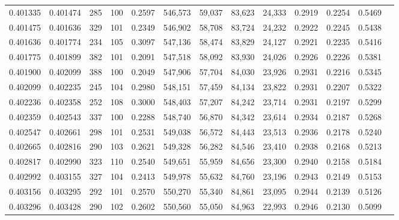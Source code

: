 \begin{tabular}{rrrrrrrrrrrrr}
0.401335 & 0.401474 &   285 & 100 &                                     0.2597 & 546,573 &  59,037 &  83,623 &  24,333 & 0.2919 & 0.2254 & 0.5469 \\
0.401475 & 0.401636 &   329 & 101 &                                     0.2349 & 546,902 &  58,708 &  83,724 &  24,232 & 0.2922 & 0.2245 & 0.5438 \\
0.401636 & 0.401774 &   234 & 105 &                                     0.3097 & 547,136 &  58,474 &  83,829 &  24,127 & 0.2921 & 0.2235 & 0.5416 \\
0.401775 & 0.401899 &   382 & 101 &                                     0.2091 & 547,518 &  58,092 &  83,930 &  24,026 & 0.2926 & 0.2226 & 0.5381 \\
0.401900 & 0.402099 &   388 & 100 &                                     0.2049 & 547,906 &  57,704 &  84,030 &  23,926 & 0.2931 & 0.2216 & 0.5345 \\
0.402099 & 0.402235 &   245 & 104 &                                     0.2980 & 548,151 &  57,459 &  84,134 &  23,822 & 0.2931 & 0.2207 & 0.5322 \\
0.402236 & 0.402358 &   252 & 108 &                                     0.3000 & 548,403 &  57,207 &  84,242 &  23,714 & 0.2931 & 0.2197 & 0.5299 \\
0.402359 & 0.402543 &   337 & 100 &                                     0.2288 & 548,740 &  56,870 &  84,342 &  23,614 & 0.2934 & 0.2187 & 0.5268 \\
0.402547 & 0.402661 &   298 & 101 &                                     0.2531 & 549,038 &  56,572 &  84,443 &  23,513 & 0.2936 & 0.2178 & 0.5240 \\
0.402665 & 0.402816 &   290 & 103 &                                     0.2621 & 549,328 &  56,282 &  84,546 &  23,410 & 0.2938 & 0.2168 & 0.5213 \\
0.402817 & 0.402990 &   323 & 110 &                                     0.2540 & 549,651 &  55,959 &  84,656 &  23,300 & 0.2940 & 0.2158 & 0.5184 \\
0.402992 & 0.403155 &   327 & 104 &                                     0.2413 & 549,978 &  55,632 &  84,760 &  23,196 & 0.2943 & 0.2149 & 0.5153 \\
0.403156 & 0.403295 &   292 & 101 &                                     0.2570 & 550,270 &  55,340 &  84,861 &  23,095 & 0.2944 & 0.2139 & 0.5126 \\
0.403296 & 0.403428 &   290 & 102 &                                     0.2602 & 550,560 &  55,050 &  84,963 &  22,993 & 0.2946 & 0.2130 & 0.5099 \\

\end{tabular}
